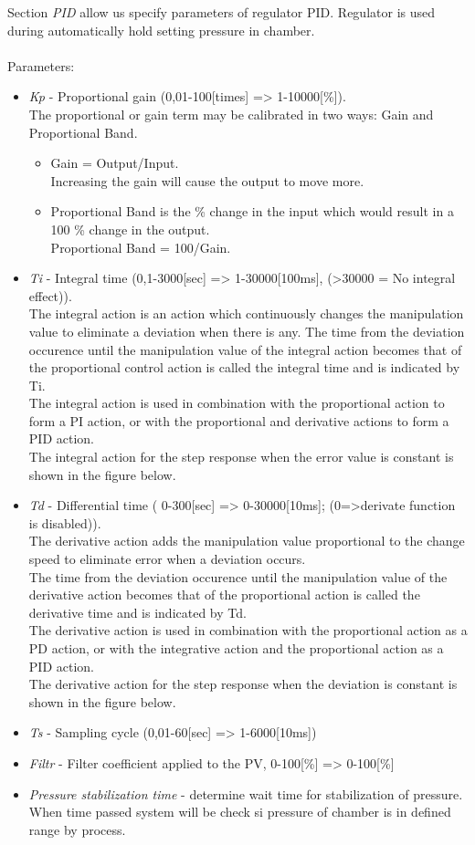 Section \textit{PID} allow us specify parameters of regulator PID. Regulator is used during automatically hold setting pressure in chamber.\\\\
Parameters:
\begin{itemize}
	\item \textit{Kp} - Proportional gain (0,01-100[times] => 1-10000[\%]). \\
	The proportional or gain term may be calibrated in two ways: Gain and Proportional Band.
	\begin{itemize}
	\item Gain = Output/Input. \\ 
			 Increasing the gain will cause the output to move more. 
	 \item Proportional Band is the \% change in the input which would result in a 100 \% change in the output.\\ 
	   	 Proportional Band = 100/Gain. 
	\end{itemize}
	\item \textit{Ti} - Integral time (0,1-3000[sec] => 1-30000[100ms], (>30000 = No integral effect)).\\ 
	The integral action is an action which continuously changes the manipulation value to eliminate a deviation when there is any. The time from the deviation occurence until the manipulation value of the integral action becomes that of the proportional control action is called the integral time and is indicated by Ti.\\
	The integral action is used in combination with the proportional action to form a PI action, or with the proportional and derivative actions to form a PID action.\\
	The integral action for the step response when the error value is constant is shown in the figure below.
	\item \textit{Td} - Differential time ( 0-300[sec] => 0-30000[10ms]; (0=>derivate function is disabled)).\\ 
	The derivative action adds the manipulation value proportional to the change speed to eliminate error when a deviation occurs.\\
	The time from the deviation occurence until the manipulation value of the derivative action becomes that of the proportional action is called the derivative time and is indicated by Td.\\
	The derivative action is used in combination with the proportional action as a PD action, or with the integrative action and the proportional action as a PID action.\\
	The derivative action for the step response when the deviation is constant is shown in the figure below.
	\item \textit{Ts} - Sampling cycle (0,01-60[sec] => 1-6000[10ms])
	\item \textit{Filtr} - Filter coefficient applied to the PV, 0-100[\%] => 0-100[\%]
	\item \textit{Pressure stabilization time} - determine wait time for stabilization of pressure. When time passed system will be check si pressure of chamber is in defined range by process.
\end{itemize}

